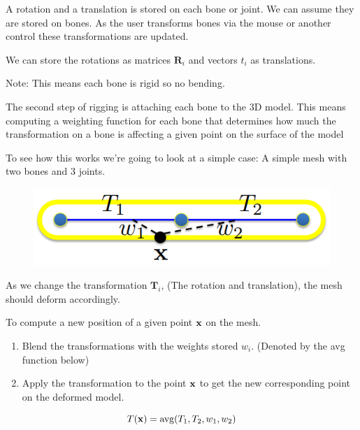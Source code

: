 \documentclass{article}
\begin{document}
A rotation and a translation is stored on each bone or joint. We can assume they are stored on bones. As the
user transforms bones via the mouse or another control these transformations are updated.

\vspace{5px}

We can store the rotations as matrices \(\mathbf{R}_{i}\) and vectors \(t_i\) as translations.

\vspace{5px}

Note: This means each bone is rigid so no bending.

\vspace{10px}

The second step of rigging is attaching each bone to the 3D model. This means computing a weighting function
for each bone that determines how much the transformation on a bone is affecting a given point on
the surface of the model

\newpage

To see how this works we're going to look at a simple case: A simple mesh with two bones and 3 joints.

\begin{figure}[!ht]
    \centering
    \includegraphics[width=0.5\linewidth]{images/skeleton_simple_model.png}
\end{figure}

As we change the transformation \(\mathbf{T}_i\), (The rotation and translation), the mesh should deform
accordingly.

\vspace{5px}

To compute a new position of a given point \(\text{\textbf{x}}\) on the mesh.

\begin{enumerate}
    \item Blend the transformations with the weights stored \(w_i\). (Denoted by the avg function below)
    \item Apply the transformation to the point \(\text{\textbf{x}}\) to get the new corresponding point
    on the deformed model.
\end{enumerate}


\[
    T(\text{\textbf{x}}) = \operatorname{avg}(T_1, T_2, w_1, w_2)
\]
\end{document}
